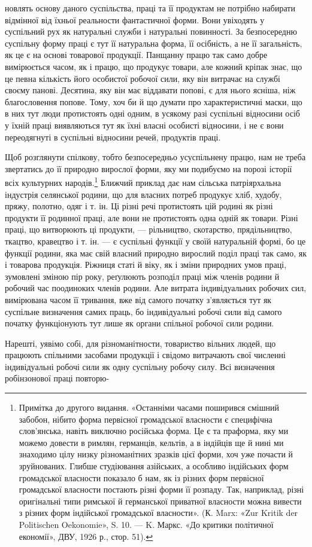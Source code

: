 новлять основу даного суспільства, праці та її продуктам не потрібно
набирати відмінної від їхньої реальности фантастичної
форми. Вони увіходять у суспільний рух як натуральні служби
і натуральні повинності. За безпосередню суспільну форму праці
є тут її натуральна форма, її осібність, а не її загальність, як це
є на основі товарової продукції. Панщанну працю так само добре
вимірюється часом, як і працю, що продукує товари, але кожний
кріпак знає, що це певна кількість його особистої робочої сили,
яку він витрачає на службі своєму панові. Десятина, яку він має
віддавати попові, є для нього ясніша, ніж благословення попове.
Тому, хоч би й що думати про характеристичні маски, що в них
тут люди протистоять одні одним, в усякому разі суспільні відносини
осіб у їхній праці виявляються тут як їхні власні особисті
відносини, і не є вони переодягнуті в суспільні відносини речей,
продуктів праці.

Щоб розглянути спілкову, тобто безпосередньо усуспільнену
працю, нам не треба звертатись до її природно вирослої форми,
яку ми подибуємо на порозі історії всіх культурних народів.\footnote{
Примітка до другого видання. «Останніми часами поширився
смішний забобон, нібито форма первісної громадської власности є специфічна
слов’янська, навіть виключно російська форма. Це є та праформа,
яку ми можемо довести в римлян, германців, кельтів, а в індійців ще й нині
ми знаходимо цілу низку різноманітних зразків цієї форми, хоч уже
почасти й зруйнованих. Глибше студіювання азійських, а особливо індійських
форм громадської власности показало б нам, як із різних форм
первісної громадської власности постають різні форми її розпаду. Так,
наприклад, різні оригінальні типи римської й германської приватної
власности можна вивести з різних форм індійської громадської власности».
(К. Marx: «Zur Kritik der Politischen Oekonomie», S. 10. — K. Маркс.
«До критики політичної економії», ДВУ, 1926 р., стор. 51).
}
Ближчий приклад дає нам сільська патріярхальна індустрія селянської
родини, що для власних потреб продукує хліб, худобу,
пряжу, полотно, одяг і т. ін. Ці різні речі протистоять цій родині
як різні продукти її родинної праці, але вони не протистоять
одна одній як товари. Різні праці, що витворюють ці продукти, —
рільництво, скотарство, прядільництво, ткацтво, кравецтво і т. ін. —
є суспільні функції у своїй натуральній формі, бо це функції
родини, яка має свій власний природно вирослий поділ праці
так само, як і товарова продукція. Ріжниця статі й віку, як і
зміни природних умов праці, зумовлені зміною пір року, реґулюють
розподіл праці між членів родини й робочий час поодиноких
членів родини. Але витрата індивідуальних робочих сил,
вимірювана часом її тривання, вже від самого початку з’являється
тут як суспільне визначення самих праць, бо індивідуальні робочі
сили від самого початку функціонують тут лише як органи спільної
робочої сили родини.

Нарешті, уявімо собі, для різноманітности, товариство вільних
людей, що працюють спільними засобами продукції і свідомо
витрачають свої численні індивідуальні робочі сили як одну суспільну
робочу силу. Всі визначення робінзонової праці повторю-